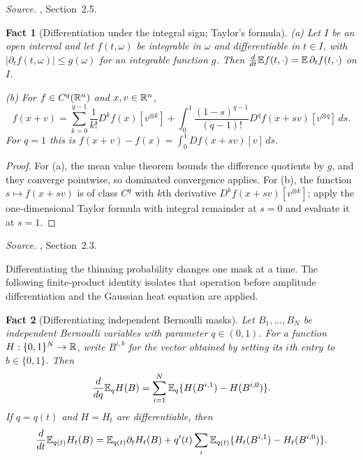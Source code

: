 \documentclass[11pt,letterpaper]{article}
\theoremstyle{plain}
\newtheorem{fact}{Fact}[section]
\begin{document}
\emph{Source.} , Section~2.5.

\begin{fact}[Differentiation under the integral sign; Taylor's formula]
\label{tb:taylor}
(a) Let \(I\) be an open interval and let \(f(t,\omega)\) be
integrable in \(\omega\) and differentiable in \(t\in I\), with
\(|\partial_t f(t,\omega)|\le g(\omega)\) for an integrable
function \(g\). Then \(\frac d{dt}\mathbb E f(t,\cdot)
=\mathbb E\,\partial_t f(t,\cdot)\) on \(I\).

(b) For \(f\in C^q(\mathbb R^n)\) and \(x,v\in\mathbb R^n\),
\[
 f(x+v)=\sum_{k=0}^{q-1}\frac1{k!}D^kf(x)[v^{\otimes k}]
 +\int_0^1\frac{(1-s)^{q-1}}{(q-1)!}D^qf(x+sv)[v^{\otimes q}]\,ds.
\]
For \(q=1\) this is \(f(x+v)-f(x)=\int_0^1Df(x+sv)[v]\,ds\).
\end{fact}

\begin{proof}
For (a), the mean value theorem bounds the difference quotients by \(g\),
and they converge pointwise, so dominated convergence applies. For (b),
the function \(s\mapsto f(x+sv)\) is of class \(C^q\) with \(k\)th derivative
\(D^kf(x+sv)[v^{\otimes k}]\); apply the one-dimensional Taylor formula with
integral remainder at \(s=0\) and evaluate it at \(s=1\).
\end{proof}

\emph{Source.} , Section~2.3.

Differentiating the thinning probability changes one mask at a time.
The following finite-product identity isolates that operation before
amplitude differentiation and the Gaussian heat equation are applied.

\begin{fact}[Differentiating independent Bernoulli masks]\label{tb:bernoulli}
Let \(B_1,\ldots,B_N\) be independent Bernoulli variables with parameter
\(q\in(0,1)\). For a function \(H:\{0,1\}^N\to\mathbb R\), write
\(B^{i,b}\) for the vector obtained by setting its \(i\)th entry to
\(b\in\{0,1\}\). Then
\[
 \frac{d}{dq}\mathbb E_q H(B)
 =\sum_{i=1}^N\mathbb E_q\{H(B^{i,1})-H(B^{i,0})\}.
\]
If \(q=q(t)\) and \(H=H_t\) are differentiable, then
\[
 \frac{d}{dt}\mathbb E_{q(t)}H_t(B)
 =\mathbb E_{q(t)}\partial_t H_t(B)
 +q'(t)\sum_i\mathbb E_{q(t)}
       \{H_t(B^{i,1})-H_t(B^{i,0})\}.
\]
\end{fact}
\end{document}
